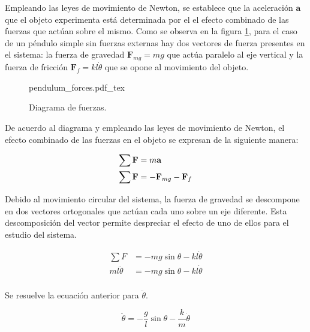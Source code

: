 Empleando las leyes de movimiento de Newton, 
se establece que la aceleración $\textbf{a}$ que el objeto
experimenta está determinada por el el
efecto combinado de las fuerzas que actúan sobre el mismo.
Como se observa en la figura \ref{fig: pendulum forces}, 
para el caso de un péndulo simple sin fuerzas externas 
hay dos vectores de fuerza presentes en el sistema:
la fuerza de gravedad $\textbf{F}_{mg} = mg$ que actúa paralelo al eje vertical 
y la fuerza de fricción $\textbf{F}_f = kl\dot{\theta}$ que se opone al movimiento del objeto. 

 \begin{figure}[ht]
    \centering
    {pendulum_forces.pdf_tex}
    \caption{Diagrama de fuerzas.}
    \label{fig: pendulum forces}
\end{figure}

De acuerdo al diagrama y empleando las leyes de movimiento de Newton, 
el efecto combinado de las fuerzas en el objeto se expresan de la 
siguiente manera:


\begin{equation}
 \begin{split}
  \sum \textbf{F} & = m \textbf{a}\\
  \sum \bold{F} & = - \bold{F}_{mg} - \bold{F}_f
 \end{split}
 \label{eq: }
\end{equation}

Debido al movimiento circular del sistema, la fuerza de gravedad
se descompone en dos vectores ortogonales que actúan cada uno sobre un eje 
diferente. Esta descomposición del vector permite despreciar
el efecto de uno de ellos para el estudio del sistema.

\begin{equation*}
 \begin{split}
  \sum F &= -mg \sin{\theta} - k l \dot{\theta}\\
  m l \ddot{\theta} &= -mg \sin{\theta} - k l \dot{\theta}\\
 \end{split}
\end{equation*}

Se resuelve la ecuación anterior para $\ddot{\theta}$.

\begin{equation}
 \ddot{\theta} = - \dfrac{g}{l} \sin{\theta} - \dfrac{k}{m} \dot{\theta}
\end{equation}


